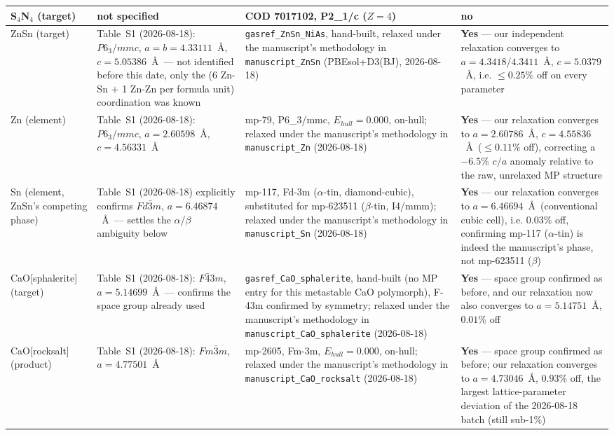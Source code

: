 \begin{longtable}{@{}p{2.6cm} p{3.0cm} p{3.6cm} p{5.2cm}@{}}
\midrule
S$_4$N$_4$ (target) & not specified & COD 7017102, P2\_1/c ($Z=4$) & no \\
\midrule
ZnSn (target) & Table~S1 (2026-08-18): $P6_3/mmc$, $a=b=4.33111$~\AA, $c=5.05386$~\AA\ --- not identified before this date, only the (6 Zn-Sn $+$ 1 Zn-Zn per formula unit) coordination was known & \texttt{gasref\_ZnSn\_NiAs}, hand-built, relaxed under the manuscript's methodology in \texttt{manuscript\_ZnSn} (PBEsol+D3(BJ), 2026-08-18) & \textbf{Yes} --- our independent relaxation converges to $a=4.3418$/$4.3411$~\AA, $c=5.0379$~\AA, i.e. $\leq 0.25\%$ off on every parameter \\
\midrule
Zn (element) & Table~S1 (2026-08-18): $P6_3/mmc$, $a=2.60598$~\AA, $c=4.56331$~\AA & mp-79, P6\_3/mmc, $E_{hull}=0.000$, on-hull; relaxed under the manuscript's methodology in \texttt{manuscript\_Zn} (2026-08-18) & \textbf{Yes} --- our relaxation converges to $a=2.60786$~\AA, $c=4.55836$~\AA\ ($\leq 0.11\%$ off), correcting a $-6.5\%$ $c/a$ anomaly relative to the raw, unrelaxed MP structure \\
\midrule
Sn (element, ZnSn's competing phase) & Table~S1 (2026-08-18) explicitly confirms $Fd\bar{3}m$, $a=6.46874$~\AA\ --- settles the $\alpha$/$\beta$ ambiguity below & mp-117, Fd-3m ($\alpha$-tin, diamond-cubic), substituted for mp-623511 ($\beta$-tin, I4/mmm); relaxed under the manuscript's methodology in \texttt{manuscript\_Sn} (2026-08-18) & \textbf{Yes} --- our relaxation converges to $a=6.46694$~\AA\ (conventional cubic cell), i.e. $0.03\%$ off, confirming mp-117 ($\alpha$-tin) is indeed the manuscript's phase, not mp-623511 ($\beta$) \\
\midrule
CaO[sphalerite] (target) & Table~S1 (2026-08-18): $F\bar{4}3m$, $a=5.14699$~\AA\ --- confirms the space group already used & \texttt{gasref\_CaO\_sphalerite}, hand-built (no MP entry for this metastable CaO polymorph), F-43m confirmed by symmetry; relaxed under the manuscript's methodology in \texttt{manuscript\_CaO\_sphalerite} (2026-08-18) & \textbf{Yes} --- space group confirmed as before, and our relaxation now also converges to $a=5.14751$~\AA, $0.01\%$ off \\
\midrule
CaO[rocksalt] (product) & Table~S1 (2026-08-18): $Fm\bar{3}m$, $a=4.77501$~\AA & mp-2605, Fm-3m, $E_{hull}=0.000$, on-hull; relaxed under the manuscript's methodology in \texttt{manuscript\_CaO\_rocksalt} (2026-08-18) & \textbf{Yes} --- space group confirmed as before; our relaxation converges to $a=4.73046$~\AA, $0.93\%$ off, the largest lattice-parameter deviation of the 2026-08-18 batch (still sub-1\%) \\

\end{longtable}

